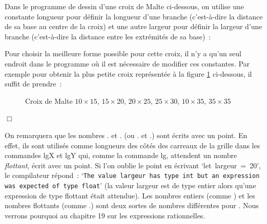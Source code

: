 \begin{exemple}{\rm
Dans le programme de dessin d'une croix de Malte ci-dessous, on
utilise une constante {\idt longueur} pour définir la longueur d'une
branche (c'est-à-dire la distance de sa base au centre de la croix) et
une autre {\idt largeur} pour définir la largeur d'une branche
(c'est-à-dire la distance entre les extrémités de sa base)~:\hfill\\[22mm]
%
\vspace*{-22mm}%


Pour choisir la meilleure forme possible pour
cette croix, il n'y a qu'un seul endroit dans le programme où il est nécessaire
de modifier ces constantes. Par exemple pour obtenir la plus petite croix représentée à la
figure \ref{fig:crmadiff} ci-dessous, il suffit de prendre~:\par
{
\parindent {}
\medskip

\vspace{\neglskip}\mbox{}\par
\vspace{\neglskip}\mbox{}\par

\medskip }
\begin{figure}[htbp]
 \caption{Croix de Malte $10\times 15$, $15\times 20$, $20\times 25$, $25\times 30$,
 $10\times 35$, $35\times 35$}
 \label{fig:crmadiff}
\end{figure}
\noindent $\Box$ }\end{exemple}

On remarquera que les nombres {.} et {.} (ou {.} et {.})
sont écrits avec un point. En effet, ils sont utilisés comme longueurs des côtés des
carreaux de la grille dans les commandes {\idt lgX} et {\idt lgY} qui, comme la commande
{\idt lg}, attendent un nombre {\em flottant}, écrit avec un point. Si l'on oublie le point en
écrivant `{\mcl let}\ {\idt largeur\ =\ 20}', le compilateur répond~:
`{\tt The value largeur has type int but an expression was expected of type float}'
(la valeur {\idt largeur} est de type entier alors qu'une expression de type flottant
était attendue). Les nombres entiers (comme {}) et les nombres flottants
(comme {.}) sont deux sortes de nombres différentes pour \ocaml. Nous verrons
pourquoi au chapitre 19 sur les expressions rationnelles.

